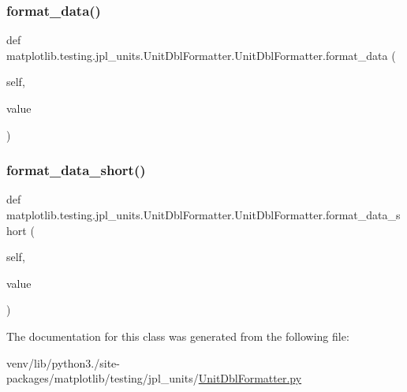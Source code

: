\subsubsection{\texorpdfstring{format\+\_\+data()}{format\_data()}}
{\footnotesize\ttfamily def matplotlib.\+testing.\+jpl\+\_\+units.\+Unit\+Dbl\+Formatter.\+Unit\+Dbl\+Formatter.\+format\+\_\+data (\begin{DoxyParamCaption}\item[{}]{self,  }\item[{}]{value }\end{DoxyParamCaption})}

\mbox{\label{classmatplotlib_1_1testing_1_1jpl__units_1_1UnitDblFormatter_1_1UnitDblFormatter_a3b492e18103350ab21213bd49abe8800}} 
\subsubsection{\texorpdfstring{format\+\_\+data\+\_\+short()}{format\_data\_short()}}
{\footnotesize\ttfamily def matplotlib.\+testing.\+jpl\+\_\+units.\+Unit\+Dbl\+Formatter.\+Unit\+Dbl\+Formatter.\+format\+\_\+data\+\_\+short (\begin{DoxyParamCaption}\item[{}]{self,  }\item[{}]{value }\end{DoxyParamCaption})}



The documentation for this class was generated from the following file\+:\begin{DoxyCompactItemize}
\item 
venv/lib/python3./site-\/packages/matplotlib/testing/jpl\+\_\+units/\hyperlink{UnitDblFormatter_8py}{Unit\+Dbl\+Formatter.\+py}\end{DoxyCompactItemize}
